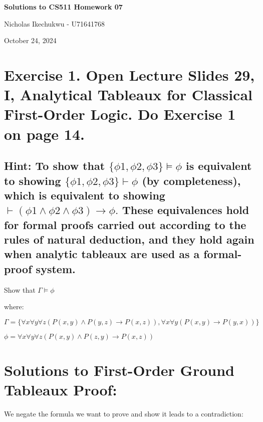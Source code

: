 \documentclass{article}
\begin{document}
\begin{center}
    \Large\textbf{Solutions to CS511 Homework 07}
    
    \vspace{0.5cm}
    
    \large Nicholas Ikechukwu - U71641768
    
    \vspace{0.3cm}
    
    \large October 24, 2024
\end{center}



\section*{Exercise 1. Open Lecture Slides 29, I, Analytical Tableaux for Classical First-Order
Logic. Do Exercise 1 on page 14. }

\subsection*{Hint: To show that $\{\phi1, \phi2, \phi3\} \models \phi$ is equivalent to showing $\{\phi1, \phi2, \phi3\}  \vdash \phi $ (by completeness),
which is equivalent to showing $\vdash (\phi1 \land \phi2 \land \phi3) \rightarrow \phi.$ These equivalences hold for formal proofs carried
out according to the rules of natural deduction, and they hold again when analytic tableaux are used
as a formal-proof system.}

\begin{mdframed}
    Show that $\Gamma \models \phi$ 
    \vspace{1em}

    where:
    \vspace{1em}

    $\Gamma = \{\forall x\forall y\forall z(P(x,y) \land P(y,z) \to P(x,z)), \forall x\forall y(P(x,y) \to P(y,x))\}$
    
    $\phi = \forall x\forall y\forall z(P(x,y) \land P(z,y) \to P(x,z))$
\end{mdframed}

\section*{Solutions to First-Order Ground Tableaux Proof:}

\vspace{1em}

We negate the formula we want to prove and show it leads to a contradiction:
\end{document}
